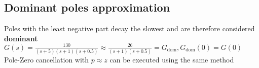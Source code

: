\subsection{Dominant poles approximation}
    Poles with the least negative part decay the slowest and are therefore considered \textbf{dominant}\\
    $G(s) = \frac{130}{(s+5) (s+1) (s+0.5)} \approx \frac{26}{(s+1) (s+0.5)} = G_{\text{dom}}, G_{\text{dom}}(0) \overset{\!}{=} G(0)$\\
    Pole-Zero cancellation with $p \approx z$ can be executed using the same method
